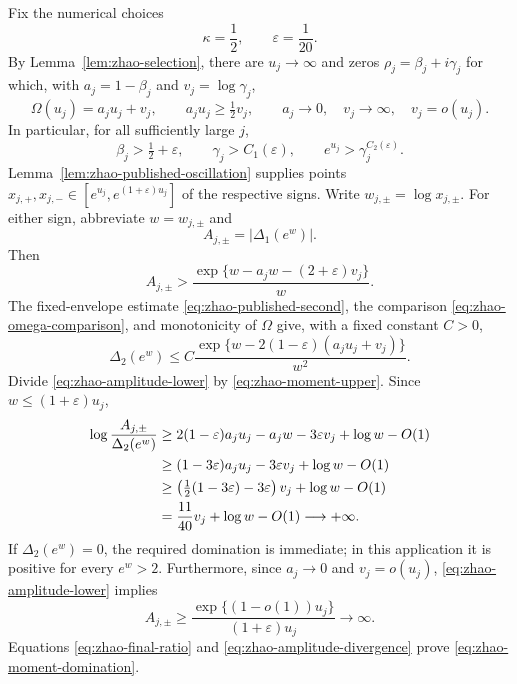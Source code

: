 \documentclass[11pt,a4paper]{article}
\numberwithin{equation}{section}
\theoremstyle{definition}\newtheorem{definition}[theorem]{Definition}
\theoremstyle{remark}\newtheorem{remark}[theorem]{Remark}
\begin{document}
Fix the numerical choices
\[
 \kappa=\frac12,\qquad\varepsilon=\frac1{20}.
\]
By Lemma~\ref{lem:zhao-selection}, there are $u_j\to\infty$ and
zeros $\rho_j=\beta_j+i\gamma_j$ for which, with
$a_j=1-\beta_j$ and $v_j=\log\gamma_j$,
\begin{equation}
 \label{eq:zhao-chosen-parameters}
 \Omega(u_j)=a_ju_j+v_j,\qquad
 a_ju_j\geq\tfrac12v_j,\qquad
 a_j\to0,\quad v_j\to\infty,\quad v_j=o(u_j).
\end{equation}
In particular, for all sufficiently large $j$,
\[
 \beta_j>\tfrac12+\varepsilon,\qquad
 \gamma_j>C_1(\varepsilon),\qquad
 e^{u_j}>\gamma_j^{C_2(\varepsilon)}.
\]
Lemma~\ref{lem:zhao-published-oscillation} supplies points
$x_{j,+},x_{j,-}\in[e^{u_j},e^{(1+\varepsilon)u_j}]$ of the
respective signs. Write $w_{j,\pm}=\log x_{j,\pm}$.
For either sign, abbreviate $w=w_{j,\pm}$ and
\[
 A_{j,\pm}=|\Delta_1(e^w)|.
\]
Then
\begin{equation}
 \label{eq:zhao-amplitude-lower}
 A_{j,\pm}>
 \frac{\exp\{w-a_jw-(2+\varepsilon)v_j\}}{w}.
\end{equation}
The fixed-envelope estimate
\eqref{eq:zhao-published-second}, the comparison
\eqref{eq:zhao-omega-comparison}, and monotonicity of $\Omega$
give, with a fixed constant $C>0$,
\begin{equation}
 \label{eq:zhao-moment-upper}
 \Delta_2(e^w)\leq
 C\frac{\exp\{w-2(1-\varepsilon)(a_ju_j+v_j)\}}{w^2}.
\end{equation}
Divide \eqref{eq:zhao-amplitude-lower} by
\eqref{eq:zhao-moment-upper}. Since
$w\leq(1+\varepsilon)u_j$,
\begin{align}
 \log\frac{A_{j,\pm}}{\Delta_2(e^w)}
 &\geq
  2(1-\varepsilon)a_ju_j-a_jw
  -3\varepsilon v_j+\log w-O(1)\notag\\
 &\geq
  (1-3\varepsilon)a_ju_j
  -3\varepsilon v_j+\log w-O(1)\notag\\
 &\geq
  \left(\tfrac12(1-3\varepsilon)-3\varepsilon\right)v_j
  +\log w-O(1)\notag\\
 &=\frac{11}{40}v_j+\log w-O(1)
   \longrightarrow+\infty.
 \label{eq:zhao-final-ratio}
\end{align}
If $\Delta_2(e^w)=0$, the required domination is immediate;
in this application it is positive for every $e^w>2$.
Furthermore, since $a_j\to0$ and $v_j=o(u_j)$,
\eqref{eq:zhao-amplitude-lower} implies
\begin{equation}
 \label{eq:zhao-amplitude-divergence}
 A_{j,\pm}\geq\frac{\exp\{(1-o(1))u_j\}}
                         {(1+\varepsilon)u_j}
 \longrightarrow\infty.
\end{equation}
Equations \eqref{eq:zhao-final-ratio} and
\eqref{eq:zhao-amplitude-divergence} prove
\eqref{eq:zhao-moment-domination}.
\end{document}
